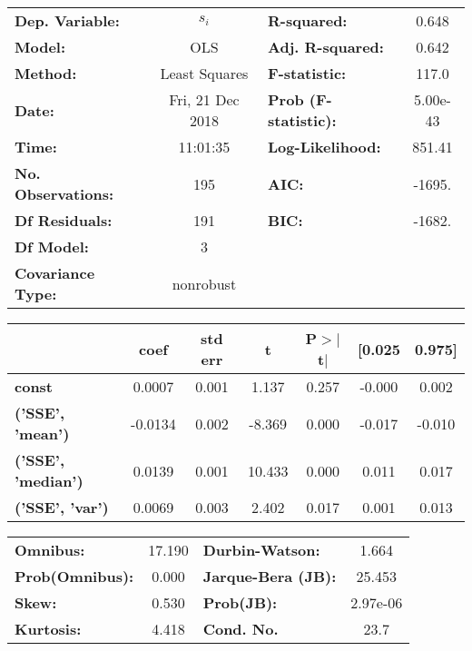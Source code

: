 \begin{center}
\begin{tabular}{lclc}
\toprule
\textbf{Dep. Variable:}    &      $s_i$       & \textbf{  R-squared:         } &    0.648  \\
\textbf{Model:}            &       OLS        & \textbf{  Adj. R-squared:    } &    0.642  \\
\textbf{Method:}           &  Least Squares   & \textbf{  F-statistic:       } &    117.0  \\
\textbf{Date:}             & Fri, 21 Dec 2018 & \textbf{  Prob (F-statistic):} & 5.00e-43  \\
\textbf{Time:}             &     11:01:35     & \textbf{  Log-Likelihood:    } &   851.41  \\
\textbf{No. Observations:} &         195      & \textbf{  AIC:               } &   -1695.  \\
\textbf{Df Residuals:}     &         191      & \textbf{  BIC:               } &   -1682.  \\
\textbf{Df Model:}         &           3      & \textbf{                     } &           \\
\textbf{Covariance Type:}  &    nonrobust     & \textbf{                     } &           \\
\bottomrule
\end{tabular}
\end{center}\begin{center}
\begin{tabular}{lcccccc}
\toprule
                                & \textbf{coef} & \textbf{std err} & \textbf{t} & \textbf{P$>$$|$t$|$} & \textbf{[0.025} & \textbf{0.975]}  \\
\midrule
\textbf{const}                  &       0.0007  &        0.001     &     1.137  &         0.257        &       -0.000    &        0.002     \\
\textbf{('SSE', 'mean')}   &      -0.0134  &        0.002     &    -8.369  &         0.000        &       -0.017    &       -0.010     \\
\textbf{('SSE', 'median')} &       0.0139  &        0.001     &    10.433  &         0.000        &        0.011    &        0.017     \\
\textbf{('SSE', 'var')}    &       0.0069  &        0.003     &     2.402  &         0.017        &        0.001    &        0.013     \\
\bottomrule
\end{tabular}
\end{center}\begin{center}
\begin{tabular}{lclc}
\toprule
\textbf{Omnibus:}       & 17.190 & \textbf{  Durbin-Watson:     } &    1.664  \\
\textbf{Prob(Omnibus):} &  0.000 & \textbf{  Jarque-Bera (JB):  } &   25.453  \\
\textbf{Skew:}          &  0.530 & \textbf{  Prob(JB):          } & 2.97e-06  \\
\textbf{Kurtosis:}      &  4.418 & \textbf{  Cond. No.          } &     23.7  \\
\bottomrule
\end{tabular}
\end{center}